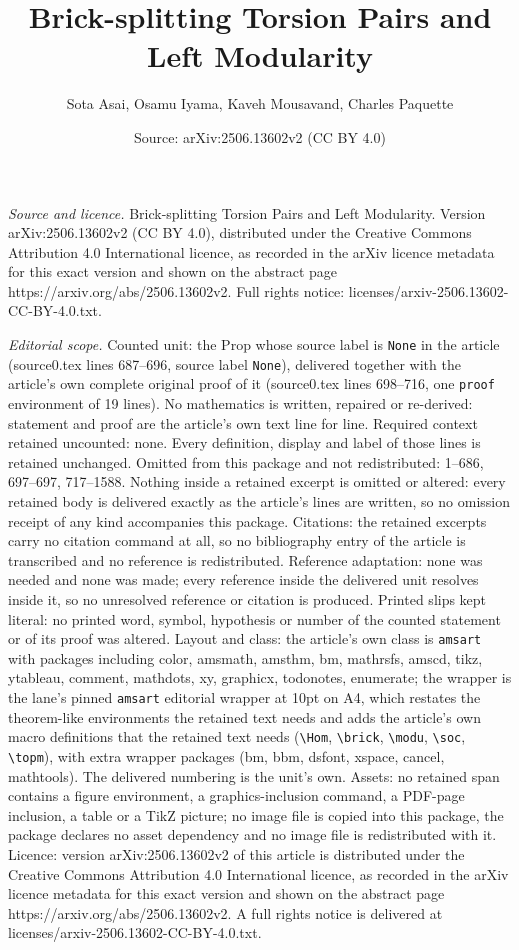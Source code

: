 \documentclass[10pt,a4paper]{amsart}
\title[Brick-splitting Torsion Pairs and Left Modularity]{Brick-splitting Torsion Pairs and Left Modularity}
\author{Sota Asai, Osamu Iyama, Kaveh Mousavand, Charles Paquette}
\date{Source: arXiv:2506.13602v2 (CC BY 4.0)}
\begin{document}
\maketitle

\noindent\emph{Source and licence.} Brick-splitting Torsion Pairs and Left Modularity. Version arXiv:2506.13602v2 (CC BY 4.0), distributed under the Creative Commons Attribution 4.0 International licence, as recorded in the arXiv licence metadata for this exact version and shown on the abstract page https://arxiv.org/abs/2506.13602v2. Full rights notice: licenses/arxiv-2506.13602-CC-BY-4.0.txt.\par\smallskip

\noindent\textit{Editorial scope.} Counted unit: the Prop whose source label is \texttt{None} in the article (source0.tex lines 687--696, source label \texttt{None}), delivered together with the article's own complete original proof of it (source0.tex lines 698--716, one \texttt{proof} environment of 19 lines). No mathematics is written, repaired or re-derived: statement and proof are the article's own text line for line. Required context retained uncounted: none. Every definition, display and label of those lines is retained unchanged. Omitted from this package and not redistributed: 1--686, 697--697, 717--1588. Nothing inside a retained excerpt is omitted or altered: every retained body is delivered exactly as the article's lines are written, so no omission receipt of any kind accompanies this package. Citations: the retained excerpts carry no citation command at all, so no bibliography entry of the article is transcribed and no reference is redistributed. Reference adaptation: none was needed and none was made; every reference inside the delivered unit resolves inside it, so no unresolved reference or citation is produced. Printed slips kept literal: no printed word, symbol, hypothesis or number of the counted statement or of its proof was altered. Layout and class: the article's own class is \texttt{amsart} with packages including color, amsmath, amsthm, bm, mathrsfs, amscd, tikz, ytableau, comment, mathdots, xy, graphicx, todonotes, enumerate; the wrapper is the lane's pinned \texttt{amsart} editorial wrapper at 10pt on A4, which restates the theorem-like environments the retained text needs and adds the article's own macro definitions that the retained text needs (\texttt{\textbackslash Hom}, \texttt{\textbackslash brick}, \texttt{\textbackslash modu}, \texttt{\textbackslash soc}, \texttt{\textbackslash topm}), with extra wrapper packages (bm, bbm, dsfont, xspace, cancel, mathtools). The delivered numbering is the unit's own. Assets: no retained span contains a figure environment, a graphics-inclusion command, a PDF-page inclusion, a table or a TikZ picture; no image file is copied into this package, the package declares no asset dependency and no image file is redistributed with it. Licence: version arXiv:2506.13602v2 of this article is distributed under the Creative Commons Attribution 4.0 International licence, as recorded in the arXiv licence metadata for this exact version and shown on the abstract page https://arxiv.org/abs/2506.13602v2. A full rights notice is delivered at licenses/arxiv-2506.13602-CC-BY-4.0.txt. 
\end{document}
